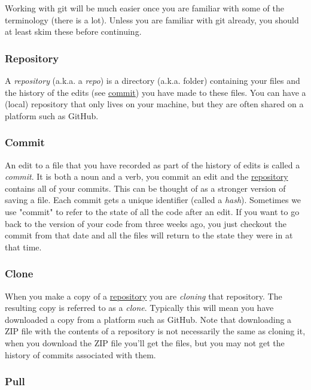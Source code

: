 \documentclass[11pt,onecolumn]{scrartcl}
\begin{document}
Working with git will be much easier once you are familiar with some of the
terminology (there is a lot). Unless you are familiar with git already, you
should at least skim these before continuing.

\subsubsection*{Repository}
\label{sec:org9185b51}

A \emph{repository} (a.k.a. a \emph{repo}) is a directory (a.k.a. folder) containing your
files and the history of the edits (see \hyperref[sec:orgf8649b1]{commit}) you have made to these files.
You can have a (local) repository that only lives on your machine, but they are
often shared on a platform such as GitHub.

\subsubsection*{Commit}
\label{sec:orgf8649b1}

An edit to a file that you have recorded as part of the history of edits is
called a \emph{commit}. It is both a noun and a verb, you commit an edit and the
\hyperref[sec:org9185b51]{repository} contains all of your commits. This can be thought of as a stronger
version of saving a file. Each commit gets a unique identifier (called a
\emph{hash}). Sometimes we use "commit" to refer to the state of all the code after
an edit. If you want to go back to the version of your code from three weeks
ago, you just checkout the commit from that date and all the files will return
to the state they were in at that time.

\subsubsection*{Clone}
\label{sec:org434e06c}

When you make a copy of a \hyperref[sec:org9185b51]{repository} you are \emph{cloning} that repository. The
resulting copy is referred to as a \emph{clone}. Typically this will mean you have
downloaded a copy from a platform such as GitHub. Note that downloading a ZIP
file with the contents of a repository is not necessarily the same as cloning
it, when you download the ZIP file you'll get the files, but you may not get the
history of commits associated with them.

\subsubsection*{Pull}
\label{sec:org4dade18}
\end{document}
